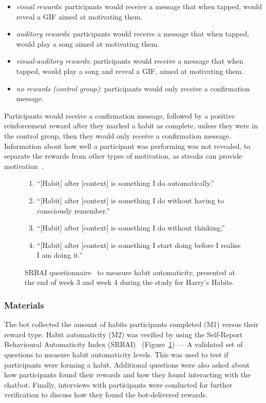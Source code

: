 \begin{itemize}
\item \textit{visual rewards}: participants would receive a message that when tapped, would reveal a GIF aimed at motivating them.
\item \textit{auditory rewards}: participants would receive a message that when tapped, would play a song aimed at motivating them.
\item \textit{visual-auditory rewards}: participants would receive a message that when tapped, would play a song and reveal a GIF, aimed at motivating them.
\item \textit{no rewards (control group)}: participants would only receive a confirmation message.
\end{itemize}

Participants would receive a confirmation message, followed by a positive reinforcement reward after they marked a habit as complete, unless they were in the control group, then they would only receive a confirmation message. Information about how well a participant was performing was not revealed, to separate the rewards from other types of motivation, as streaks can provide motivation~\cite{article_dont_kick_habit}.

\begin{figure}[H]
  \centering
  \begin{enumerate}
    \item ``[Habit] after [context] is something I do automatically.''
    \item ``[Habit] after [context] is something I do without having to consciously remember.''
    \item ``[Habit] after [context] is something I do without thinking.''
    \item ``[Habit] after [context]  is something I start doing before I realise I am doing it.''
  \end{enumerate}
  \caption{SRBAI questionnaire~\cite{article_4q_SRBAI} to measure habit automaticity, presented at the end of week 3 and week 4 during the study for Harry's Habits.}
  \label{fig:srbai_questionnaire}
\end{figure}

\subsubsection{Materials}
The bot collected the amount of habits participants completed (M1) versus their reward type. Habit automaticity (M2) was verified by using the Self-Report Behavioural Automaticity Index (SRBAI)~\cite{article_4q_SRBAI} (Figure~\ref{fig:srbai_questionnaire}) --- A validated set of questions to measure habit automaticity levels. This was used to test if participants were forming a habit. Additional questions were also asked about how participants found their rewards and how they found interacting with the chatbot. Finally, interviews with participants were conducted for further verification to discuss how they found the bot-delivered rewards.

